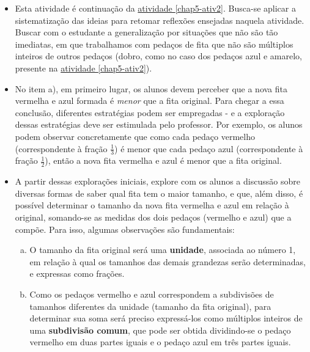 \begin{multicols}{2}
\begin{orientacoes}{}{}
\begin{itemize} %
  \item     Esta atividade é continuação da \hyperref[chap5-ativ2]{atividade \ref{chap5-ativ2}}. Busca-se aplicar a sistematização das ideias para retomar reflexões ensejadas naquela atividade. Buscar com o estudante a generalização por situações que não são tão imediatas, em que trabalhamos com pedaços de fita que não são múltiplos inteiros de outros pedaços (dobro, como no caso dos pedaços azul e amarelo, presente na \hyperref[chap5-ativ2]{atividade \ref{chap5-ativ2}}).
\item  No item a), em primeiro lugar, os alunos devem perceber que a nova fita vermelha e azul formada é {\it menor} que a fita original. Para chegar a essa conclusão, diferentes estratégias podem ser empregadas - e a exploração dessas estratégias deve ser estimulada pelo professor. Por exemplo, os alunos podem observar concretamente que como cada pedaço vermelho (correspondente à fração $\frac{1}{3}$) é menor que cada pedaço azul (correspondente à fração $\frac{1}{2}$), então a nova fita vermelha e azul é menor que a fita original.
  \item  A partir dessas explorações iniciais, explore com os alunos a discussão sobre diversas formas de saber qual fita tem o maior tamanho, e que, além disso, é possível determinar o tamanho da nova fita vermelha e azul em relação à original, somando-se as medidas dos dois pedaços (vermelho e azul) que a compõe. Para isso, algumas observações são fundamentais:
  \begin{enumerate}[a)]
    \item O tamanho da fita original será uma {\bf unidade}, associada ao número 1, em relação à qual os tamanhos das demais grandezas serão determinadas, e expressas como frações.
    \item Como os pedaços vermelho e azul correspondem a subdivisões de tamanhos diferentes da unidade (tamanho da fita original), para determinar sua soma será preciso expressá-los como múltiplos inteiros de uma {\bf subdivisão comum}, que pode ser obtida dividindo-se o pedaço vermelho em duas partes iguais e o pedaço azul em três partes iguais.
 \end{enumerate}


\begin{center}
\end{center}
\end{itemize}
\end{orientacoes}
\end{multicols}
